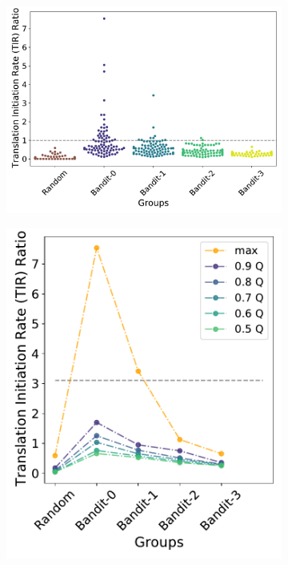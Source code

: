 \begin{figure}[!ht]
    \centering
    \begin{subfigure}[b]{0.48\textwidth}
        \centering
        \caption{}
        \includegraphics[scale=0.35]{plots/Supplementary/swarmplot_salis.pdf}
    \end{subfigure}
    \begin{subfigure}[b]{0.25\textwidth}
        \centering
        \caption{}
        \includegraphics[scale=0.35]{plots/Supplementary/quantplot_salis.pdf}

\end{subfigure}
\end{figure}
